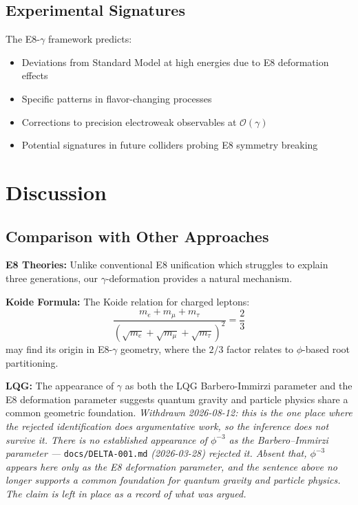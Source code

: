 \documentclass[12pt,a4paper]{article}
\begin{document}
\subsection{Experimental Signatures}

The E8-$\gamma$ framework predicts:

\begin{itemize}
\item Deviations from Standard Model at high energies due to E8 deformation effects
\item Specific patterns in flavor-changing processes
\item Corrections to precision electroweak observables at $\mathcal{O}(\gamma)$
\item Potential signatures in future colliders probing E8 symmetry breaking
\end{itemize}

\section{Discussion}

\subsection{Comparison with Other Approaches}

\textbf{E8 Theories:} Unlike conventional E8 unification which struggles to explain three generations, our $\gamma$-deformation provides a natural mechanism.

\textbf{Koide Formula:} The Koide relation for charged leptons:
\begin{equation}
\frac{m_e + m_\mu + m_\tau}{(\sqrt{m_e} + \sqrt{m_\mu} + \sqrt{m_\tau})^2} = \frac{2}{3}
\end{equation}
may find its origin in E8-$\gamma$ geometry, where the $2/3$ factor relates to $\phi$-based root partitioning.

\textbf{LQG:} The appearance of $\gamma$ as both the LQG Barbero-Immirzi parameter and the E8 deformation parameter suggests quantum gravity and particle physics share a common geometric foundation.
\emph{Withdrawn 2026-08-12: this is the one place where the rejected identification does argumentative work, so the inference does not survive it. There is no established appearance of $\phi^{-3}$ as the Barbero--Immirzi parameter ---} \texttt{docs/DELTA-001.md} \emph{(2026-03-28) rejected it. Absent that, $\phi^{-3}$ appears here only as the E8 deformation parameter, and the sentence above no longer supports a common foundation for quantum gravity and particle physics. The claim is left in place as a record of what was argued.}
\end{document}
